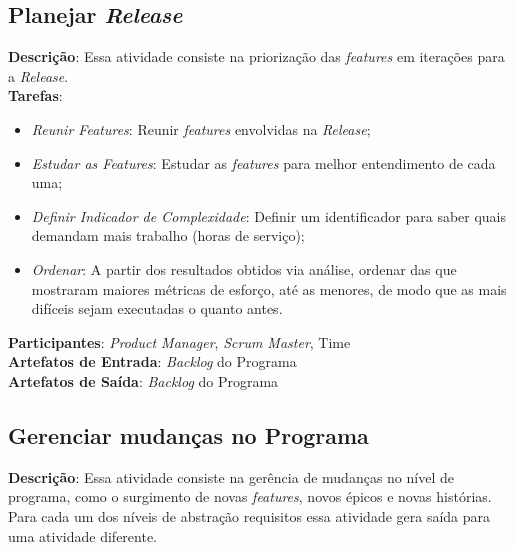 \subsection{Planejar \textit{Release}}
  \textbf{Descrição}: Essa atividade consiste na priorização das \textit{features} em iterações para a \textit{Release}. \\

  \textbf{Tarefas}:
  \begin{itemize}
   \item \indent \textit{Reunir \textit{Features}}: Reunir \textit{features} envolvidas na \textit{Release};

   \item \indent \textit{Estudar as \textit{Features}}: Estudar as \textit{features} para melhor entendimento de cada uma;

   \item \indent \textit{Definir Indicador de Complexidade}: Definir um identificador para saber quais demandam mais trabalho (horas de serviço);

   \item \indent \textit{Ordenar}: A partir dos resultados obtidos via análise, ordenar das que mostraram maiores métricas de esforço, até as menores, de modo que as mais difíceis sejam executadas o quanto antes.
  \end{itemize}

  \textbf{Participantes}: \textit{Product Manager}, \textit{Scrum Master}, Time\\

  \textbf{Artefatos de Entrada}: \textit{Backlog} do Programa \\

  \textbf{Artefatos de Saída}:  \textit{Backlog} do Programa \\

\subsection{Gerenciar mudanças no Programa}
  \textbf{Descrição}: Essa atividade consiste na gerência de mudanças no nível de programa, como o surgimento de novas 
  \textit{features}, novos épicos e novas histórias. Para cada um dos níveis de abstração requisitos essa atividade gera saída
  para uma atividade diferente.\\

